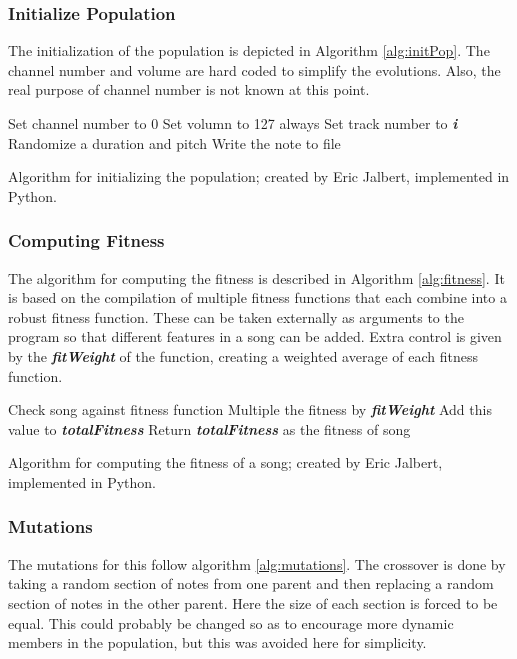 \documentclass{article}
\begin{document}
\subsubsection*{Initialize Population}
The initialization of the population is depicted in Algorithm \ref{alg:initPop}. The channel number and volume are hard coded to simplify the evolutions. Also, the real purpose of channel number is not known at this point. 

\begin{algorithm}[h]
\dontprintsemicolon
{}
\Begin
{
  \SetLine
  Set channel number to 0\;
  Set volumn to 127 always\;
  {
    Set track number to \textbf{\textit{i}}\; 
    {
        Randomize a duration and pitch\;
        Write the note to file\;
    }
  }
}
\caption{Algorithm for initializing the population; created by Eric Jalbert, implemented in Python.}
\label{alg:initPop}
\end{algorithm}

\subsubsection*{Computing Fitness}
The algorithm for computing the fitness is described in Algorithm \ref{alg:fitness}. It is based on the compilation of multiple fitness functions that each combine into a robust fitness function. These can be taken externally as arguments to the program so that different features in a song can be added. Extra control is given by the \textbf{\textit{fitWeight}} of the function, creating a weighted average of each fitness function. 

\begin{algorithm}[h]
\dontprintsemicolon
{}
\Begin
{
  \SetLine
  {
    Check song against fitness function\;
    Multiple the fitness by \textbf{\textit{fitWeight}}\;
    Add this value to \textbf{\textit{totalFitness}}\;
  }
  Return \textbf{\textit{totalFitness}} as the fitness of song\;
}
\caption{Algorithm for computing the fitness of a song; created by Eric Jalbert, implemented in Python.}
\label{alg:fitness}
\end{algorithm}


\subsubsection*{Mutations}
The mutations for this follow algorithm \ref{alg:mutations}. The crossover is done by taking a random section of notes from one parent and then replacing a random section of notes in the other parent. Here the size of each section is forced to be equal. This could probably be changed so as to encourage more dynamic members in the population, but this was avoided here for simplicity.
\end{document}
